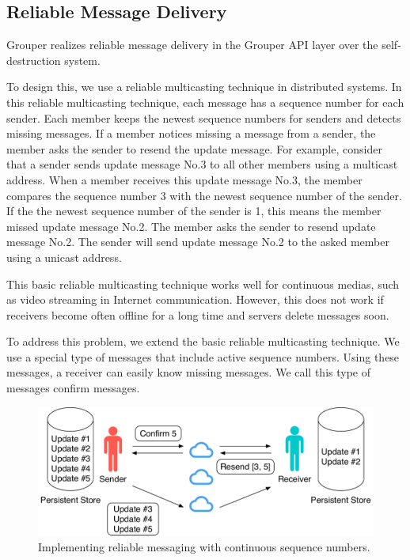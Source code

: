 \documentclass[twocolumn,10pt]{article}
\begin{document}
\subsection{Reliable Message Delivery}

Grouper realizes reliable message delivery in the Grouper API layer over the self-destruction system.

To design this, we use a reliable multicasting technique in distributed systems\cite{tanenbaum2007distributed}.
In this reliable multicasting technique, each message has a sequence number for each sender.
Each member keeps the newest sequence numbers for senders and detects missing messages.
If a member notices missing a message from a sender, the member asks the sender to resend the update message.
For example, consider that a sender sends update message No.3 to all other members using a multicast address.
When a member receives this update message No.3, the member compares the sequence number 3 with the newest sequence number of the sender.
If the the newest sequence number of the sender is 1, this means the member missed update message No.2.
The member asks the sender to resend update message No.2.
The sender will send update message No.2 to the asked member using a unicast address.

This basic reliable multicasting technique works well for continuous medias, such as video streaming in Internet communication.
However, this does not work if receivers become often offline for a long time and servers delete messages soon.

To address this problem, we extend the basic reliable multicasting technique.
We use a special type of messages that include active sequence numbers.
Using these messages, a receiver can easily know missing messages.
We call this type of messages confirm messages.

\begin{figure}[t]
	\centering
	\includegraphics[scale=0.38]{reliable_sync}
	\caption{Implementing reliable messaging with continuous sequence numbers.}
\end{figure}
\end{document}
